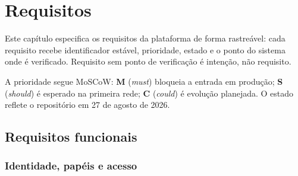 \chapter{Requisitos}
\label{cap:requisitos}

Este capítulo especifica os requisitos da plataforma de forma rastreável: cada
requisito recebe identificador estável, prioridade, estado e o ponto do sistema
onde é verificado. Requisito sem ponto de verificação é intenção, não requisito.

A prioridade segue MoSCoW: \textbf{M} (\emph{must}) bloqueia a entrada em
produção; \textbf{S} (\emph{should}) é esperado na primeira rede; \textbf{C}
(\emph{could}) é evolução planejada. O estado reflete o repositório em 27 de
agosto de 2026.

\section{Requisitos funcionais}

\subsection{Identidade, papéis e acesso}

